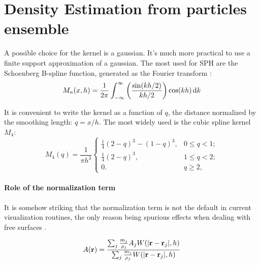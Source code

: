 \section{Density Estimation from particles ensemble}
A possible choice for the kernel is a gaussian.
It's much more practical to use a finite support approximation of a gaussian.
The most used for SPH are the Schoenberg \cite{Schoenberg1988} B-spline function, generated as the Fourier transform %
\citep{Price2012}:
\begin{equation}
M_n(x, h) = \frac{1}{2\pi}\int_{-\infty}^{\infty}{\left(\frac{\sin(kh/2)}{kh/2}\right)\cos(kh)\operatorname{d}\!{k}}
\end{equation}

It is convenient to write the kernel as a function of $q$, the distance normalized by the smoothing length: $q=x/h$.
The most widely used is the cubic spline kernel $M_4$:
\begin{equation}
M_4(q) = \frac{1}{\pi h^3} \left\{ \begin{array}{ll}
\frac{1}{4}(2-q)^3 - (1 - q)^{3}, & 0 \le q < 1; \\
\frac{1}{4}(2-q)^3, & 1 \le q < 2; \\
0. & q \ge 2, \end{array} \right. \label{eq:cubicspline}
\end{equation}

\paragraph{Role of the normalization term}
It is somehow striking that the normalization term is not the default in current visualization routines, the only reason being spurious effects when dealing with free surfaces \citep{Price2007}.

\begin{equation}
 A(\boldsymbol{\mathbf{r}}) = \dfrac{\sum_j \frac{m_j}{\rho_j} A_j W(|\boldsymbol{\mathbf{r}} - \boldsymbol{\mathbf{r}}_j|,h)}{\sum_j \frac{m_j}{\rho_j} W(|\boldsymbol{\mathbf{r}} - \boldsymbol{\mathbf{r}}_j|,h)}
\end{equation}

